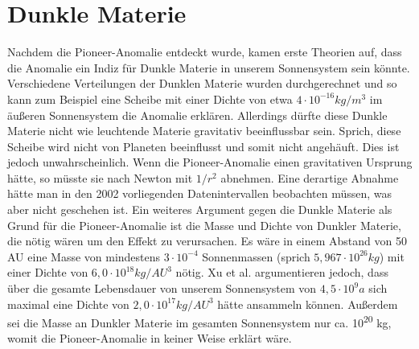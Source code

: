 \section{Dunkle Materie}\label{Dm}

Nachdem die Pioneer-Anomalie entdeckt wurde, kamen erste Theorien auf,
dass die Anomalie ein Indiz f\"ur Dunkle Materie in unserem
Sonnensystem sein k\"onnte. Verschiedene Verteilungen der Dunklen
Materie wurden durchgerechnet und so kann zum Beispiel eine Scheibe mit
einer Dichte von etwa $4\cdot 10^{-16}\mathit{kg}/m^{3}$ im
\"au{\ss}eren Sonnensystem die Anomalie erkl\"aren. Allerdings d\"urfte
diese Dunkle Materie nicht wie leuchtende Materie gravitativ
beeinflussbar sein\cite{Turyshev2010}. Sprich, diese Scheibe wird nicht
von Planeten beeinflusst und somit nicht angeh\"auft. Dies ist jedoch
unwahrscheinlich. Wenn die Pioneer-Anomalie einen gravitativen Ursprung
h\"atte, so m\"usste sie nach Newton mit $1/r^{2}$ abnehmen. Eine
derartige Abnahme h\"atte man in den 2002 vorliegenden Datenintervallen
beobachten m\"ussen, was aber nicht geschehen ist. Ein weiteres
Argument gegen die Dunkle Materie als Grund f\"ur die Pioneer-Anomalie
ist die Masse und Dichte von Dunkler Materie, die n\"otig w\"aren um
den Effekt zu verursachen. Es w\"are in einem Abstand von 50 AU eine
Masse von mindestens $3\cdot 10^{-4}$ Sonnenmassen (sprich
$5,967\cdot 10^{26}\mathit{kg}$) mit einer Dichte von $6,0\cdot
10^{18}\mathit{kg}/\mathit{AU}^{3}$ n\"otig. Xu et al. \cite{Xu2008} argumentieren jedoch, dass \"uber die gesamte Lebensdauer
von unserem Sonnensystem von $4,5\cdot 10^{9}a$ sich maximal eine Dichte von
$2,0\cdot 10^{17}\mathit{kg}/\mathit{AU}^{3}$ h\"atte ansammeln
k\"onnen. Au{\ss}erdem sei die Masse an Dunkler Materie im gesamten
Sonnensystem nur ca. {}10\textsuperscript{20 }kg, womit die
Pioneer-Anomalie in keiner Weise erkl\"art w\"are.



